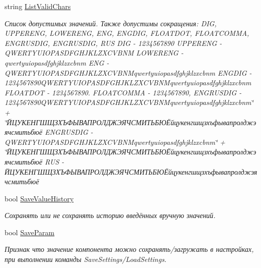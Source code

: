 \begin{DoxyCompactItemize}
string \mbox{\hyperlink{class_f_b_a_1_1_combo_box_f_b_a_a43bf49ecd116617472f9813bfd3f92b3}{List\+Valid\+Chars}}
\begin{DoxyCompactList}\small\item\em Список допустимых значений. Также допустимы сокращения\+: D\+IG, U\+P\+P\+E\+R\+E\+NG, L\+O\+W\+E\+R\+E\+NG, E\+NG, E\+N\+G\+D\+IG, F\+L\+O\+A\+T\+D\+OT, F\+L\+O\+A\+T\+C\+O\+M\+MA, E\+N\+G\+R\+U\+S\+D\+IG, E\+N\+G\+R\+U\+S\+D\+IG, R\+US D\+IG -\/ 1234567890 U\+P\+P\+E\+R\+E\+NG -\/ Q\+W\+E\+R\+T\+Y\+U\+I\+O\+P\+A\+S\+D\+F\+G\+H\+J\+K\+L\+Z\+X\+C\+V\+B\+NM L\+O\+W\+E\+R\+E\+NG -\/ qwertyuiopasdfghjklzxcbnm E\+NG -\/ Q\+W\+E\+R\+T\+Y\+U\+I\+O\+P\+A\+S\+D\+F\+G\+H\+J\+K\+L\+Z\+X\+C\+V\+B\+N\+Mqwertyuiopasdfghjklzxcbnm E\+N\+G\+D\+IG -\/ 1234567890\+Q\+W\+E\+R\+T\+Y\+U\+I\+O\+P\+A\+S\+D\+F\+G\+H\+J\+K\+L\+Z\+X\+C\+V\+B\+N\+Mqwertyuiopasdfghjklzxcbnm F\+L\+O\+A\+T\+D\+OT -\/ 1234567890. F\+L\+O\+A\+T\+C\+O\+M\+MA -\/ 1234567890, E\+N\+G\+R\+U\+S\+D\+IG -\/ 1234567890\+Q\+W\+E\+R\+T\+Y\+U\+I\+O\+P\+A\+S\+D\+F\+G\+H\+J\+K\+L\+Z\+X\+C\+V\+B\+N\+Mqwertyuiopasdfghjklzxcbnm\char`\"{} + \char`\"{}ЙЦУКЕНГШЩЗХЪФЫВАПРОЛДЖЭЯЧСМИТЬБЮЁйцукенгшщзхъфывапролджэячсмитьбюё E\+N\+G\+R\+U\+S\+D\+IG -\/ Q\+W\+E\+R\+T\+Y\+U\+I\+O\+P\+A\+S\+D\+F\+G\+H\+J\+K\+L\+Z\+X\+C\+V\+B\+N\+Mqwertyuiopasdfghjklzxcbnm\char`\"{} + \char`\"{}ЙЦУКЕНГШЩЗХЪФЫВАПРОЛДЖЭЯЧСМИТЬБЮЁйцукенгшщзхъфывапролджэячсмитьбюё R\+US -\/ ЙЦУКЕНГШЩЗХЪФЫВАПРОЛДЖЭЯЧСМИТЬБЮЁйцукенгшщзхъфывапролджэячсмитьбюё \end{DoxyCompactList}\item 
bool \mbox{\hyperlink{class_f_b_a_1_1_combo_box_f_b_a_a23279a6ee843d71d495dbe733b2cc34f}{Save\+Value\+History}}
\begin{DoxyCompactList}\small\item\em Сохранять или не сохранять историю введённых вручную значений. \end{DoxyCompactList}\item 
bool \mbox{\hyperlink{class_f_b_a_1_1_combo_box_f_b_a_a4ee51fe58a55c0c2b76c15988c9f487d}{Save\+Param}}
\begin{DoxyCompactList}\small\item\em Признак что значение компонента можно сохранять/загружать в настройках, при выполнении команды Save\+Settings/\+Load\+Settings. \end{DoxyCompactList}\item 

\end{DoxyCompactItemize}
